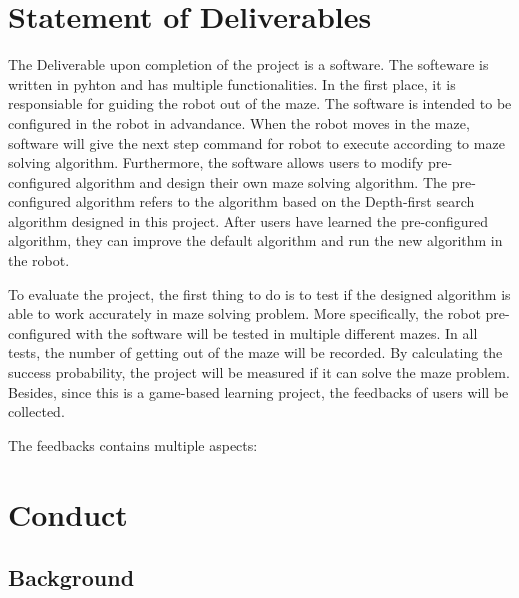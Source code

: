 \documentclass[11pt,times,oneside,openright,hardcopy]{eeereport}
\begin{document}
\section{Statement of Deliverables}
The Deliverable upon completion of the project is a software. The softeware is written in pyhton and has multiple functionalities. In the first place, it is responsiable for guiding the robot out of the maze.
The software is intended to be configured in the robot in advandance. When the robot moves in the maze, software will give the next step command for robot to execute according to maze solving algorithm.
Furthermore, the software allows users to modify pre-configured algorithm and design their own maze solving algorithm. The pre-configured algorithm refers to the algorithm based on the Depth-first search algorithm designed in this project.
After users have learned the pre-configured algorithm, they can improve the default algorithm and run the new algorithm in the robot.

To evaluate the project, the first thing to do is to test if the designed algorithm is able to work accurately in maze solving problem. More specifically, the robot pre-configured with the software will be tested in multiple different mazes.
In all tests, the number of getting out of the maze will be recorded. By calculating the success probability, the project will be measured if it can solve the maze problem.
Besides, since this is a game-based learning project, the feedbacks of users will be collected. 

The feedbacks contains multiple aspects:

\section{Conduct}

\subsection{Background}
\end{document}
